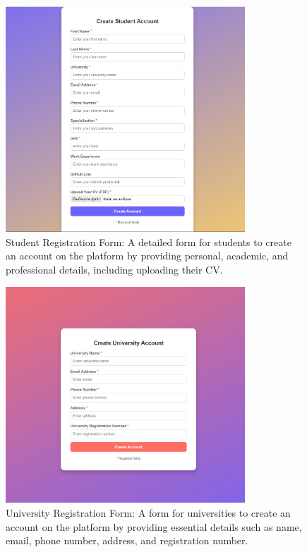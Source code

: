 \begin{figure}[H]
\centering
\includegraphics[width=0.8\textwidth]{Images/5.jpg}
\caption{\label{fig:metamodel5}Student Registration Form: A detailed form for students to create an account on the platform by providing personal, academic, and professional details, including uploading their CV.}
\end{figure}

\begin{figure}[H]
\centering
\includegraphics[width=0.8\textwidth]{Images/6.jpg}
\caption{\label{fig:metamodel6}University Registration Form: A form for universities to create an account on the platform by providing essential details such as name, email, phone number, address, and registration number.}
\end{figure}

